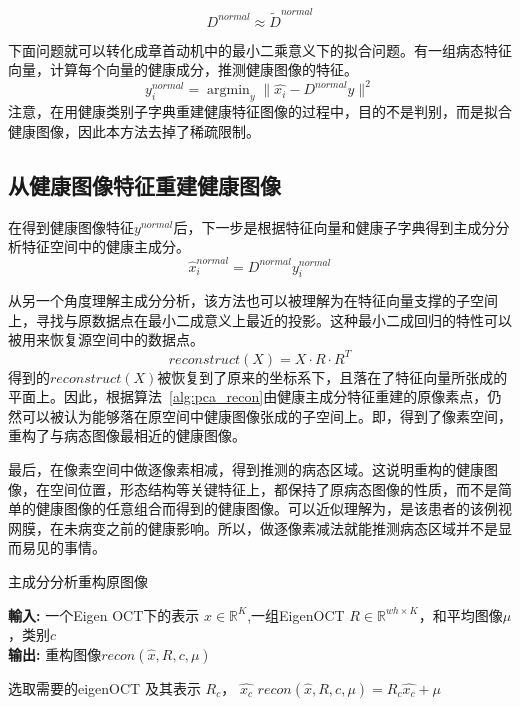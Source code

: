     \begin{equation}
        D^{normal} \approx \tilde{D}^{normal}
    \end{equation}

    下面问题就可以转化成章首动机中的最小二乘意义下的拟合问题。有一组病态特征向量，计算每个向量的健康成分，推测健康图像的特征。
    \begin{equation}
        y_i^{normal} = \mathop{\arg \min} _{y} \|\hat{x_i} - D^{normal} y\| ^ 2 
    \end{equation}
    注意，在用健康类别子字典重建健康特征图像的过程中，目的不是判别，而是拟合健康图像，因此本方法去掉了稀疏限制。
    


    \subsection{从健康图像特征重建健康图像}
    在得到健康图像特征$y^{normal}$后，下一步是根据特征向量和健康子字典得到主成分分析特征空间中的健康主成分。
    \begin{equation}
        \hat{x}_i^{normal} = D^{normal} y_i^{normal}
    \end{equation}

    从另一个角度理解主成分分析，该方法也可以被理解为在特征向量支撑的子空间上，寻找与原数据点在最小二成意义上最近的投影。这种最小二成回归的特性可以被用来恢复源空间中的数据点。
    \begin{equation}
        reconstruct(X) = X \cdot R \cdot R^T        
    \end{equation}
    得到的$reconstruct(X)$被恢复到了原来的坐标系下，且落在了特征向量所张成的平面上。因此，根据算法~\ref{alg:pca_recon}由健康主成分特征重建的原像素点，仍然可以被认为能够落在原空间中健康图像张成的子空间上。即，得到了像素空间，重构了与病态图像最相近的健康图像。

    最后，在像素空间中做逐像素相减，得到推测的病态区域。这说明重构的健康图像，在空间位置，形态结构等关键特征上，都保持了原病态图像的性质，而不是简单的健康图像的任意组合而得到的健康图像。可以近似理解为，是该患者的该例视网膜，在未病变之前的健康影响。所以，做逐像素减法就能推测病态区域并不是显而易见的事情。

    \begin{algorithm}[b]
        \caption{主成分分析重构原图像} %
        \hspace*{0.02in} {\bf 輸入:} %
        一个Eigen OCT下的表示 $\hat{x} \in \mathbb{R} ^{K} $,一组EigenOCT $R \in \mathbb{R} ^{wh \times K}$，和平均图像$\mu$，类别$c$\\
        \hspace*{0.02in} {\bf 输出:} %
        重构图像$recon(\hat{x}, R, c, \mu)$
        \begin{algorithmic}[1]
            \State 选取需要的eigenOCT 及其表示 $R_c$， $\hat{x_c}$
            \State $recon(\hat{x}, R, c, \mu) = R_c \hat{x_c} + \mu$
        \end{algorithmic}
        \label{alg:pca_recon}
    \end {algorithm}

